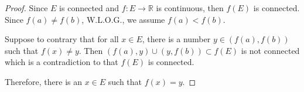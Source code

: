\begin{Exercise}
\begin{proof}
Since $E$ is connected and $f:E\to\mathbb{R}$ is continuous, then $f(E)$ is connected. Since $f(a) \neq f(b) $, W.L.O.G., we assume $f(a) < f(b)$. 

Suppose to contrary that for all $x\in E$, there is a number $y\in\left(f(a), f(b)\right)$ such that $f(x) \neq y$. Then $(f(a), y)\cup(y,f(b)) \subset f(E)$ is not connected which is a contradiction to that $f(E)$ is connected.

Therefore, there is an $x\in E$ such that $f(x) = y$.
\end{proof}
\end{Exercise}